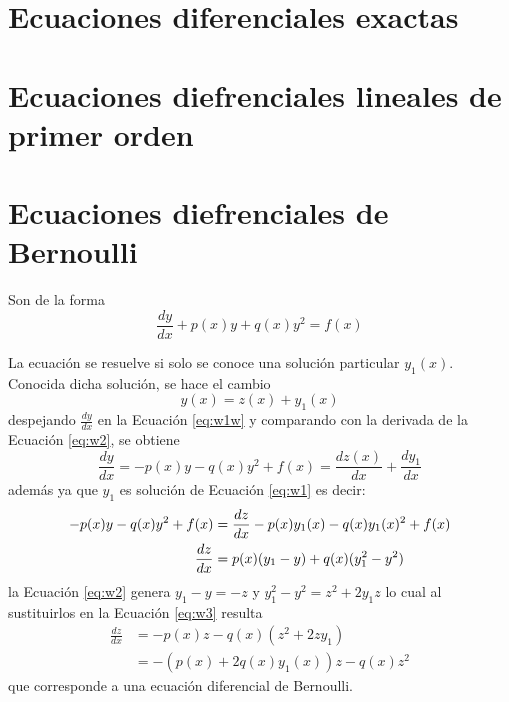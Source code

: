 \documentclass[10pt,]{krantz}
\theoremstyle{definition}
\theoremstyle{definition}
\theoremstyle{definition}
\theoremstyle{remark}
\begin{document}
\hypertarget{ecuaciones-diferenciales-exactas}{%
\section{Ecuaciones diferenciales exactas}\label{ecuaciones-diferenciales-exactas}}

\hypertarget{ecuaciones-diefrenciales-lineales-de-primer-orden}{%
\section{Ecuaciones diefrenciales lineales de primer orden}\label{ecuaciones-diefrenciales-lineales-de-primer-orden}}

\hypertarget{ecuaciones-diefrenciales-de-bernoulli}{%
\section{Ecuaciones diefrenciales de Bernoulli}\label{ecuaciones-diefrenciales-de-bernoulli}}

Son de la forma
\begin{equation}
\frac{dy}{dx}+p(x)y+q(x)y^{2}=f(x)
\label{eq:w1w}
\end{equation}

La ecuación se resuelve si solo se conoce una solución particular \(y_{1}(x)\). Conocida dicha solución, se hace el cambio
\begin{equation}
y(x)=z(x)+y_{1}(x)
\label{eq:w2}
\end{equation}
despejando \(\frac{dy}{dx}\) en la Ecuación \eqref{eq:w1w} y comparando con la derivada de la Ecuación \eqref{eq:w2}, se obtiene
\[\frac{dy}{dx}=-p(x)y-q(x)y^{2}+f(x)=\frac {dz(x)}{dx}+\frac {dy_{1}}{dx}
\]
además ya que \(y_1\) es solución de Ecuación \eqref{eq:w1} es decir:
\begin{align}
-p(x)y-q(x)y^{2}+f(x)&=\frac {dz}{dx}-p(x)y_{1}(x)-q(x)y_{1}(x)^{2}+f(x)\notag\\
\frac{dz}{dx}&=p(x)(y_{1}-y)+q(x)(y_{1}^{2}-y^{2})\label{eq:w3}
\end{align}
la Ecuación \eqref{eq:w2} genera \(y_1-y=-z\) y \(y_1^2-y^2=z^2+2y_1z\) lo cual al sustituirlos en la Ecuación \eqref{eq:w3} resulta
\begin{align*}
\frac{dz}{dx}&=-p(x)z-q(x) \left(z^{2}+2zy_{1}\right)\\
&=-\left(p(x)+2q(x)y_{1}(x)\right)z-q(x)z^{2}
\end{align*}
que corresponde a una ecuación diferencial de Bernoulli.
\end{document}
